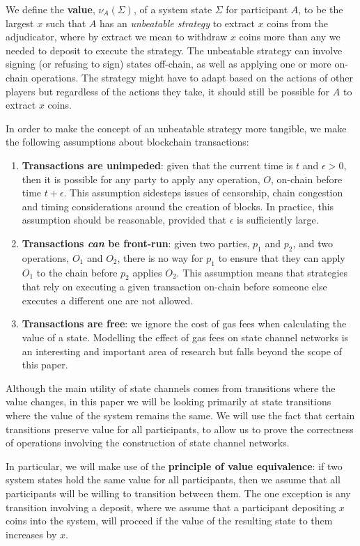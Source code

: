 \documentclass{article}
\begin{document}
We define the \textbf{value}, $\nu_A(\Sigma)$, of a system state $\Sigma$ for participant $A$,
to be the largest $x$ such that $A$ has an \textit{unbeatable strategy} to extract $x$
coins from the adjudicator, where by extract we mean to withdraw $x$ coins more than any we needed to deposit to execute the strategy.
The unbeatable strategy can involve signing (or refusing to sign) states off-chain, as well as
applying one or more on-chain operations.
The strategy might have to adapt based on the actions of other players but regardless of
the actions they take, it should still be possible for $A$ to extract $x$ coins.

In order to make the concept of an unbeatable strategy more tangible, we make the following assumptions about blockchain transactions:
\begin{enumerate}
  \item \textbf{Transactions are unimpeded}: given that the current time is $t$ and $\epsilon > 0$, then it is possible for any party to apply any operation, $O$, on-chain before time $t + \epsilon$.
  This assumption sidesteps issues of censorship, chain congestion and timing considerations around the creation of blocks.
  In practice, this assumption should be reasonable, provided that $\epsilon$ is sufficiently large.
  \item \textbf{Transactions \textit{can} be front-run}: given two parties, $p_1$ and $p_2$, and two operations, $O_1$ and $O_2$, there is no way for $p_1$ to ensure that they can apply $O_1$ to the chain before $p_2$ applies $O_2$.
  This assumption means that strategies that rely on executing a given transaction on-chain before someone else executes a different one are not allowed.
  \item \textbf{Transactions are free}: we ignore the cost of gas fees when calculating the value of a state.
  Modelling the effect of gas fees on state channel networks is an interesting and important area of research but falls beyond the scope of this paper.
\end{enumerate}

Although the main utility of state channels comes from transitions where the value changes,
in this paper we will be looking primarily at state transitions where the value of the system
remains the same.
We will use the fact that certain transitions preserve value for all participants, to allow us
to prove the correctness of operations involving the construction of state channel networks.

In particular, we will make use of the \textbf{principle of value equivalence}: if two system
states hold the same value for all participants, then we assume that all participants will
be willing to transition between them.
The one exception is any transition involving a deposit, where we assume that a participant depositing
$x$ coins into the system, will proceed if the value of the resulting state to them increases by $x$.
\end{document}
